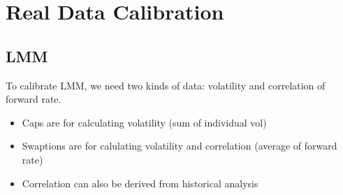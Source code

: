 \newpage
\section{Real Data Calibration}
\subsection{LMM}
To calibrate LMM, we need two kinds of data: volatility and correlation of forward rate.
\begin{itemize}
\item {\color{red} Caps are for calculating volatility (sum of individual vol)}
\item {\color{red} Swaptions are for calulating volatility and correlation (average of forward rate)}
\item Correlation can also be derived from historical analysis
\end{itemize}
